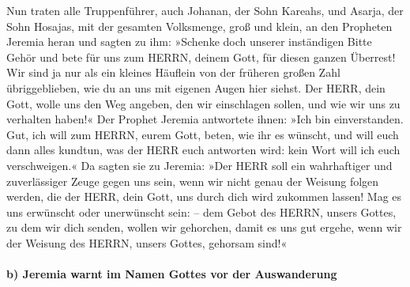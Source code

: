 Nun traten alle Truppenführer, auch Johanan, der Sohn
Kareahs, und Asarja, der Sohn Hosajas, mit der gesamten Volksmenge, groß
und klein, an den Propheten Jeremia heran und sagten zu
ihm: »Schenke doch unserer inständigen Bitte Gehör und bete für uns zum
HERRN, deinem Gott, für diesen ganzen Überrest! Wir sind ja nur als ein
kleines Häuflein von der früheren großen Zahl übriggeblieben, wie du an
uns mit eigenen Augen hier siehst. Der HERR, dein Gott,
wolle uns den Weg angeben, den wir einschlagen sollen, und wie wir uns
zu verhalten haben!« Der Prophet Jeremia antwortete ihnen:
»Ich bin einverstanden. Gut, ich will zum HERRN, eurem Gott, beten, wie
ihr es wünscht, und will euch dann alles kundtun, was der HERR euch
antworten wird: kein Wort will ich euch verschweigen.« Da
sagten sie zu Jeremia: »Der HERR soll ein wahrhaftiger und zuverlässiger
Zeuge gegen uns sein, wenn wir nicht genau der Weisung folgen werden,
die der HERR, dein Gott, uns durch dich wird zukommen lassen!
Mag es uns erwünscht oder unerwünscht sein: -- dem Gebot
des HERRN, unsers Gottes, zu dem wir dich senden, wollen wir gehorchen,
damit es uns gut ergehe, wenn wir der Weisung des HERRN, unsers Gottes,
gehorsam sind!«

\hypertarget{b-jeremia-warnt-im-namen-gottes-vor-der-auswanderung}{%
\paragraph{b) Jeremia warnt im Namen Gottes vor der
Auswanderung}\label{b-jeremia-warnt-im-namen-gottes-vor-der-auswanderung}}

